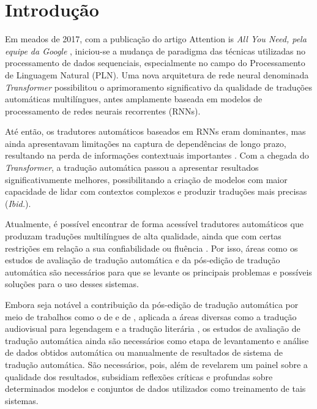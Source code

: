 \documentclass[portuguese]{textolivre}
\begin{document}
\section{Introdução}
Em meados de 2017, com a publicação do artigo Attention is \textit{All You Need, pela equipe da Google} \cite{vaswani_attention_2017}, iniciou-se a mudança de paradigma das técnicas utilizadas no processamento de dados sequenciais, especialmente no campo do Processamento de Linguagem Natural (PLN). Uma nova arquitetura de rede neural denominada \textit{Transformer} possibilitou o aprimoramento significativo da qualidade de traduções automáticas multilíngues, antes amplamente baseada em modelos de processamento de redes neurais recorrentes (RNNs).

Até então, os tradutores automáticos baseados em RNNs eram dominantes, mas ainda apresentavam limitações na captura de dependências de longo prazo, resultando na perda de informações contextuais importantes \cite{iosifova_techniques_2020}. Com a chegada do \textit{Transformer}, a tradução automática passou a apresentar resultados significativamente melhores, possibilitando a criação de modelos com maior capacidade de lidar com contextos complexos e produzir traduções mais precisas (\textit{Ibid.}).

Atualmente, é possível encontrar de forma acessível tradutores automáticos que produzam traduções multilíngues de alta qualidade, ainda que com certas restrições em relação a sua confiabilidade \cite{pena_aguilar_challenging_2023} ou fluência \cite{banitz_machine_2020}. Por isso, áreas como os estudos de avaliação de tradução automática e da pós-edição de tradução automática são necessários para que se levante os principais problemas e possíveis soluções para o uso desses sistemas.

Embora seja notável a contribuição da pós-edição de tradução automática por meio de trabalhos como o de \textcite{koponen_is_2016} e de \textcite{ohagan_routledge_2019}, aplicada a áreas diversas como a tradução audiovisual para legendagem e a tradução literária \cite{costa_translation_2020,koglin_quality_2023}, os estudos de avaliação de tradução automática ainda são necessários como etapa de levantamento e análise de dados obtidos automática ou manualmente de resultados de sistema de tradução automática. São necessários, pois, além de revelarem um painel sobre a qualidade dos resultados, subsidiam reflexões críticas e profundas sobre determinados modelos e conjuntos de dados utilizados como treinamento de tais sistemas.
\end{document}
